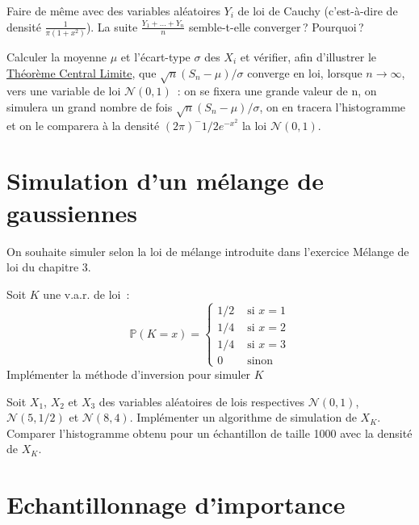 \label{V-lgntcl2}
Faire de même avec des variables aléatoires \(Y_i\) de loi de Cauchy
(c'est-à-dire de densité \(\frac{1}{\pi(1+x^2)}\)). La suite
\(\frac{Y_1 + \ldots +Y_n}{n}\) semble-t-elle converger\,?
Pourquoi\,?

\label{V-lgntcl3}
Calculer la moyenne \(\mu\) et l'écart-type \(\sigma\) des \(X_i\) et
vérifier, afin d'illustrer le
\href{Probabilité\%20IV.pdf\%20\#TCL}{Théorème Central Limite}, que
\(\sqrt{n} (S_n - \mu)/\sigma\) converge en loi, lorsque
\(n \to \infty\), vers une variable de loi \(\mathcal{N}(0, 1)\)~: on se
fixera une grande valeur de n, on simulera un grand nombre de fois
\(\sqrt{n} (S_n - \mu)/\sigma\), on en tracera l'histogramme et on le
comparera à la densité \((2\pi)^-1/2 e^{-x^2}\) la loi
\(\mathcal{N}(0, 1)\).

\section{Simulation d'un mélange de
gaussiennes}\label{V-simulation-dun-muxe9lange-de-gaussiennes}

On souhaite simuler selon la loi de mélange introduite dans l'exercice
Mélange de loi du chapitre 3.

\label{V-melloi1}
Soit \(K\) une v.a.r. de loi~:
\[\mathbb{P}(K=x) = \left\{\begin{array}{ll} 1/2 & \text{ si }x = 1 \\ 1/4 & \text{ si }x = 2 \\ 1/4 & \text{ si }x = 3 \\ 0 & \text{ sinon} \end{array} \right.\]
Implémenter la méthode d'inversion pour simuler
\(K\)

\label{V-melloi2}
Soit \(X_1\), \(X_2\) et \(X_3\) des variables aléatoires de lois
respectives \(\mathcal{N}(0,1)\), \(\mathcal{N}(5,1/2)\) et
\(\mathcal{N}(8,4)\). Implémenter un algorithme de simulation de
\(X_K\). Comparer l'histogramme obtenu pour un échantillon de taille
1000 avec la densité de \(X_K\).

\section{Echantillonnage
d'importance}\label{V-echantillonnage-dimportance-2}

